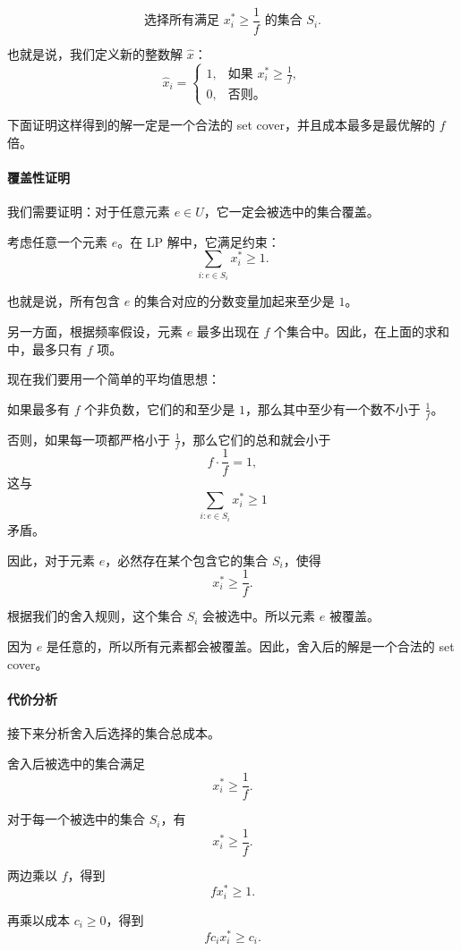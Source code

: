 \documentclass[UTF8,openany,12pt]{ctexbook}
\theoremstyle{remark}
\begin{document}
\[
\text{选择所有满足 } x_i^* \ge \frac{1}{f} \text{ 的集合 } S_i.
\]

也就是说，我们定义新的整数解 $\hat{x}$：
\[
\hat{x}_i =
\begin{cases}
1, & \text{如果 } x_i^* \ge \frac{1}{f},\\
0, & \text{否则。}
\end{cases}
\]

下面证明这样得到的解一定是一个合法的 set cover，并且成本最多是最优解的 $f$ 倍。

\paragraph{覆盖性证明}

我们需要证明：对于任意元素 $e \in U$，它一定会被选中的集合覆盖。

考虑任意一个元素 $e$。在 LP 解中，它满足约束：
\[
\sum_{i: e \in S_i} x_i^* \ge 1.
\]

也就是说，所有包含 $e$ 的集合对应的分数变量加起来至少是 $1$。

另一方面，根据频率假设，元素 $e$ 最多出现在 $f$ 个集合中。因此，在上面的求和中，最多只有 $f$ 项。

现在我们要用一个简单的平均值思想：

如果最多有 $f$ 个非负数，它们的和至少是 $1$，那么其中至少有一个数不小于 $\frac{1}{f}$。

否则，如果每一项都严格小于 $\frac{1}{f}$，那么它们的总和就会小于
\[
f \cdot \frac{1}{f} = 1,
\]
这与
\[
\sum_{i: e \in S_i} x_i^* \ge 1
\]
矛盾。

因此，对于元素 $e$，必然存在某个包含它的集合 $S_i$，使得
\[
x_i^* \ge \frac{1}{f}.
\]

根据我们的舍入规则，这个集合 $S_i$ 会被选中。所以元素 $e$ 被覆盖。

因为 $e$ 是任意的，所以所有元素都会被覆盖。因此，舍入后的解是一个合法的 set cover。

\paragraph{代价分析}

接下来分析舍入后选择的集合总成本。

舍入后被选中的集合满足
\[
x_i^* \ge \frac{1}{f}.
\]

对于每一个被选中的集合 $S_i$，有
\[
x_i^* \ge \frac{1}{f}.
\]

两边乘以 $f$，得到
\[
f x_i^* \ge 1.
\]

再乘以成本 $c_i \ge 0$，得到
\[
f c_i x_i^* \ge c_i.
\]
\end{document}
